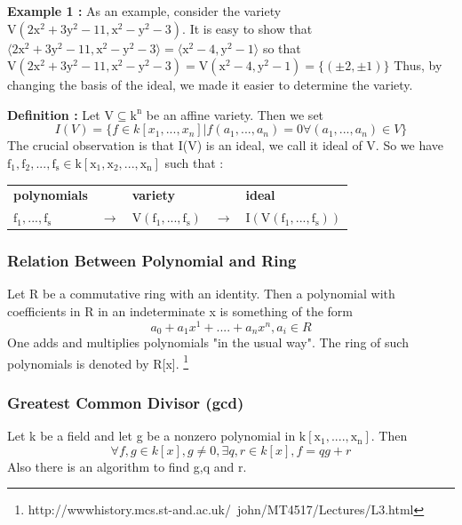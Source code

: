 \documentclass[11pt]{article}
\begin{document}
 \textbf{Example 1 :}\newline
As an example, consider the variety $\mathrm{V(2x^2+3y^2-11,x^2-y^2-3)}$. \newline It is easy to show that \newline $\mathrm{\langle 2x^2+3y^2-11,x^2-y^2-3 \rangle = \langle x^2-4,y^2-1 \rangle }$  
so that \newline 
$\mathrm{V(2x^2+3y^2-11,x^2-y^2-3)=V(x^2-4,y^2-1)=\{( \pm 2,\pm 1)\} }$\newline
Thus, by changing the basis of the ideal, we made it easier to determine the variety.\newline

\textbf{Definition  :}\newline
Let $\mathrm{V \subseteq k^n}$ be an affine variety. Then we set
\begin{equation}
  I(V)= \{ f \in k[x_1,...,x_n] | f(a_1,...,a_n)=0 \forall (a_1,...,a_n) \in V \}
\end{equation}
The crucial observation is that I(V) is an ideal, we call it ideal of V. So we have $\mathrm{f_1,f_2,...,f_s \in k[x_1,x_2,...,x_n]}$ such that : \newline

\begin{center}
\begin{tabular}{ l l l l l }
\textbf{polynomials} &  &\textbf{variety}&  & \textbf{ideal} \\
$\mathrm{f_1,...,f_s }$ & $\mathrm{\longrightarrow}$&$\mathrm{V(f_1,...,f_s)}$ &$\mathrm{\longrightarrow}$ & $\mathrm{I(V(f_1,...,f_s))}$ \\
\end{tabular}
\end{center}


\subsubsection{Relation Between Polynomial and Ring}
Let R be a commutative ring with an identity. Then a polynomial with coefficients in R in an indeterminate x is something of the form 
\begin{equation}
   a_0+a_1x^1+....+a_nx^n , a_i \in R
\end{equation}
One adds and multiplies polynomials "in the usual way". The ring of such polynomials is denoted by R[x]. \footnote{http://www\-history.mcs.st-and.ac.uk/~john/MT4517/Lectures/L3.html}

\subsubsection{Greatest Common Divisor (gcd)}
Let k be a field and let g be a nonzero polynomial in $\mathrm{k[x_1,....,x_n]}$. Then 
\begin{equation}
   \forall f,g \in k[x] , g \neq 0, \exists q,r \in k[x] , f=qg+r
\end{equation}
Also there is an algorithm to find g,q and r.\newline
\end{document}
